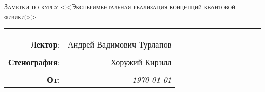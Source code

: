 
\begin{center}
    \LARGE \textsc{Заметки по курсу <<Экспериментальная реализация концепций квантовой физики>>}
\end{center}

\hrule

\phantom{42}

\begin{flushright}
    \begin{tabular}{rr}
        \textbf{Лектор}: 
        & Андрей Вадимович Турлапов \\
        & \\
        \textbf{Стенография}: 
        & Хоружий Кирилл \\
        & \\
        \textbf{От}: &
        \textit{\today}\\
    \end{tabular}
\end{flushright}

\thispagestyle{empty}
\tableofcontents
\newpage

